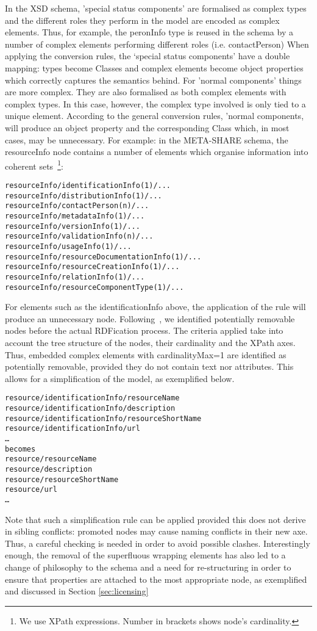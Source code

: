 \documentclass{llncs}
\begin{document}
{In the XSD schema, 'special status components' are formalised as complex types and the different roles they perform in the model are encoded as complex elements. Thus, for example, the peronInfo type is reused in the schema by a number of complex elements performing different roles (i.e. contactPerson) When applying the conversion rules, the ‘special status components’ have a double mapping: types become Classes and complex elements become object properties which correctly captures the semantics behind. For 'normal components' things are more complex. They are also formalised as both complex elements with complex types. In this case, however, the complex type involved is only tied to a unique element. According to the general conversion rules, 'normal components,  will produce an object property and the corresponding Class which, in most cases, may be unnecessary. For example: in the META-SHARE schema, the resourceInfo node contains a number of elements which organise information into coherent sets~\footnote{We use XPath expressions. Number in brackets shows node’s cardinality.}:
{\footnotesize
\begin{verbatim}
resourceInfo/identificationInfo(1)/...
resourceInfo/distributionInfo(1)/...
resourceInfo/contactPerson(n)/...
resourceInfo/metadataInfo(1)/...
resourceInfo/versionInfo(1)/...
resourceInfo/validationInfo(n)/...
resourceInfo/usageInfo(1)/...
resourceInfo/resourceDocumentationInfo(1)/...
resourceInfo/resourceCreationInfo(1)/...
resourceInfo/relationInfo(1)/...
resourceInfo/resourceComponentType(1)/...
\end{verbatim}}
For elements such as the identificationInfo above, the application of the rule will produce an unnecessary node. Following~\cite{Villegas2014}, we identified potentially removable nodes before the actual RDFication process. The criteria applied take into account the tree structure of the nodes, their cardinality and the XPath axes. Thus, embedded complex elements with cardinalityMax=1 are identified as potentially removable, provided they do not contain text nor attributes. This allows for a simplification of the model, as exemplified below.
{\footnotesize
\begin{verbatim}
resource/identificationInfo/resourceName
resource/identificationInfo/description
resource/identificationInfo/resourceShortName
resource/identificationInfo/url
…
becomes
resource/resourceName
resource/description
resource/resourceShortName
resource/url
…
\end{verbatim}}
Note that such a simplification rule can be applied provided this does not derive in sibling conflicts: promoted nodes may cause naming conflicts in their new axe. Thus, a careful checking is needed in order to avoid possible clashes.
Interestingly enough, the removal of the superfluous wrapping elements has also led to a change of philosophy to the schema and a need for re-structuring in order to ensure that properties are attached to the most appropriate node, as exemplified and discussed in Section \ref{sec:licensing}

}
\end{document}
